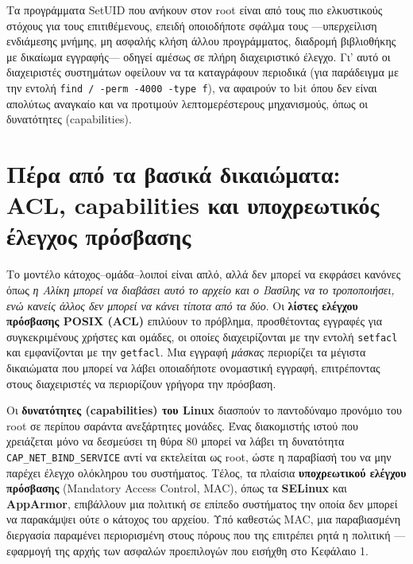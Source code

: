 Τα προγράμματα SetUID που ανήκουν στον root είναι από τους πιο ελκυστικούς στόχους για τους επιτιθέμενους, επειδή οποιοδήποτε σφάλμα τους —υπερχείλιση ενδιάμεσης μνήμης, μη ασφαλής κλήση άλλου προγράμματος, διαδρομή βιβλιοθήκης με δικαίωμα εγγραφής— οδηγεί αμέσως σε πλήρη διαχειριστικό έλεγχο. Γι' αυτό οι διαχειριστές συστημάτων οφείλουν να τα καταγράφουν περιοδικά (για παράδειγμα με την εντολή \texttt{find / -perm -4000 -type f}), να αφαιρούν το bit όπου δεν είναι απολύτως αναγκαίο και να προτιμούν λεπτομερέστερους μηχανισμούς, όπως οι δυνατότητες (capabilities).

\section{Πέρα από τα βασικά δικαιώματα: ACL, capabilities και υποχρεωτικός έλεγχος πρόσβασης}\label{sec:2.3}
Το μοντέλο κάτοχος–ομάδα–λοιποί είναι απλό, αλλά δεν μπορεί να εκφράσει κανόνες όπως \emph{η Αλίκη μπορεί να διαβάσει αυτό το αρχείο και ο Βασίλης να το τροποποιήσει, ενώ κανείς άλλος δεν μπορεί να κάνει τίποτα από τα δύο}. Οι \textbf{λίστες ελέγχου πρόσβασης POSIX (ACL)} επιλύουν το πρόβλημα, προσθέτοντας εγγραφές για συγκεκριμένους χρήστες και ομάδες, οι οποίες διαχειρίζονται με την εντολή \texttt{setfacl} και εμφανίζονται με την \texttt{getfacl}. Μια εγγραφή \emph{μάσκας} περιορίζει τα μέγιστα δικαιώματα που μπορεί να λάβει οποιαδήποτε ονομαστική εγγραφή, επιτρέποντας στους διαχειριστές να περιορίζουν γρήγορα την πρόσβαση.

Οι \textbf{δυνατότητες (capabilities) του Linux} διασπούν το παντοδύναμο προνόμιο του root σε περίπου σαράντα ανεξάρτητες μονάδες. Ένας διακομιστής ιστού που χρειάζεται μόνο να δεσμεύσει τη θύρα 80 μπορεί να λάβει τη δυνατότητα \texttt{CAP\_NET\_BIND\_SERVICE} αντί να εκτελείται ως root, ώστε η παραβίασή του να μην παρέχει έλεγχο ολόκληρου του συστήματος. Τέλος, τα πλαίσια \textbf{υποχρεωτικού ελέγχου πρόσβασης} (Mandatory Access Control, MAC), όπως τα \textbf{SELinux} και \textbf{AppArmor}, επιβάλλουν μια πολιτική σε επίπεδο συστήματος την οποία δεν μπορεί να παρακάμψει ούτε ο κάτοχος του αρχείου. Υπό καθεστώς MAC, μια παραβιασμένη διεργασία παραμένει περιορισμένη στους πόρους που της επιτρέπει ρητά η πολιτική —εφαρμογή της αρχής των ασφαλών προεπιλογών που εισήχθη στο Κεφάλαιο 1.

